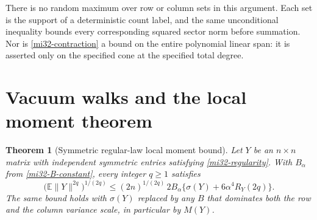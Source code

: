 \documentclass[11pt]{article}
\newtheorem{theorem}{Theorem}[section]
\theoremstyle{definition}
\theoremstyle{remark}
\newcommand{\E}{\mathbb E}
\newcommand{\norm}[1]{\lVert#1\rVert}
\begin{document}
There is no random maximum over row or column sets in this argument.
Each set is the support of a deterministic count label, and the same
unconditional inequality bounds every corresponding squared sector
norm before summation. Nor is \eqref{mi32-contraction} a bound on the
entire polynomial linear span: it is asserted only on the specified
cone at the specified total degree.

\section{Vacuum walks and the local moment theorem}
\label{mi32-vacuum-section}

\begin{theorem}[Symmetric regular-law local moment bound]
\label{mi32-local-theorem}
Let $Y$ be an $n\times n$ matrix with independent symmetric entries
satisfying \eqref{mi32-regularity}. With $B_\alpha$ from
\eqref{mi32-B-constant}, every integer $q\ge1$ satisfies
\begin{equation}\label{mi32-local-moment}
 \bigl(\E\norm{Y}^{2q}\bigr)^{1/(2q)}
 \le(2n)^{1/(2q)}\,2B_\alpha
       \bigl\{\sigma(Y)+6\alpha^4R_Y(2q)\bigr\}.
\end{equation}
The same bound holds with $\sigma(Y)$ replaced by any $B$ that
dominates both the row and the column variance scale, in particular by
$M(Y)$.
\end{theorem}
\end{document}

